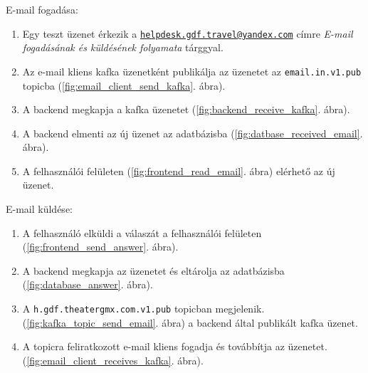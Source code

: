 E-mail fogadása:
\begin{enumerate}
	\item Egy teszt üzenet érkezik a \href{mailto:helpdesk.gdf.travel@yandex.com}{\nolinkurl{helpdesk.gdf.travel@yandex.com}} címre
	\emph{E-mail fogadásának és küldésének folyamata} tárggyal.
	\item Az e-mail kliens kafka üzenetként publikálja az üzenetet az \texttt{email.in.v1.pub} topicba (\ref{fig:email_client_send_kafka}. ábra).
	\item A backend megkapja a kafka üzenetet (\ref{fig:backend_receive_kafka}. ábra).
	\item A backend elmenti az új üzenet az adatbázisba (\ref{fig:datbase_received_email}. ábra).
	\item A felhasználói felületen (\ref{fig:frontend_read_email}. ábra) elérhető az új üzenet.
\end{enumerate}

\bigskip

E-mail küldése:
\begin{enumerate}
	\item A felhasználó elküldi a válaszát a felhasználói felületen (\ref{fig:frontend_send_answer}. ábra).
	\item A backend megkapja az üzenetet és eltárolja az adatbázisba (\ref{fig:database_answer}. ábra).
	\item A \texttt{h.gdf.theater\textunderscore gmx.com.v1.pub} topicban megjelenik. (\ref{fig:kafka_topic_send_email}. ábra) a backend által publikált kafka üzenet.
	\item A topicra feliratkozott e-mail kliens fogadja és továbbítja az üzenetet. (\ref{fig:email_client_receives_kafka}. ábra).
\end{enumerate}
 


